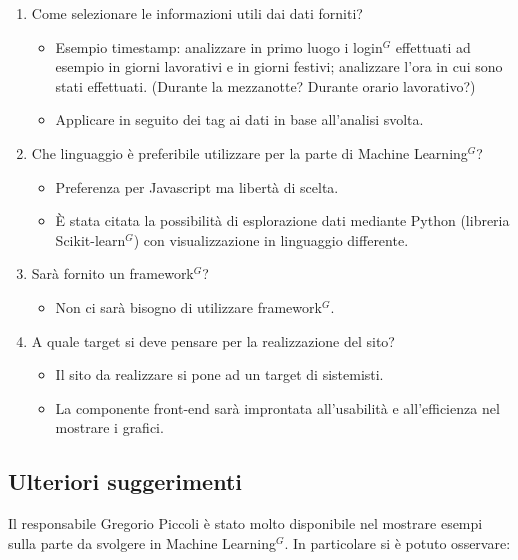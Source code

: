 \begin{enumerate}
	\item Come selezionare le informazioni utili dai dati forniti?
	\begin{itemize}
		\item Esempio timestamp: analizzare in primo luogo i login$^{G}$ effettuati ad esempio in giorni lavorativi e in giorni festivi; analizzare l'ora in cui sono stati effettuati. (Durante la mezzanotte? Durante orario lavorativo?)
		\item Applicare in seguito dei tag ai dati in base all'analisi svolta.
	\end{itemize}

	\item Che linguaggio è preferibile utilizzare per la parte di Machine Learning$^{G}$?
	\begin{itemize}
		\item Preferenza per Javascript ma libertà di scelta.
		\item \`E stata citata la possibilità di esplorazione dati mediante Python (libreria Scikit-learn$^{G}$) con visualizzazione in linguaggio differente.
	\end{itemize}

	\item Sarà fornito un framework$^{G}$?
	\begin{itemize}
		\item Non ci sarà bisogno di utilizzare framework$^{G}$.
	\end{itemize}

	\item A quale target si deve pensare per la realizzazione del sito?
	\begin{itemize}
		\item Il sito da realizzare si pone ad un target di sistemisti.
		\item La componente front-end sarà improntata all'usabilità e all'efficienza nel mostrare i grafici.
	\end{itemize}

\end{enumerate}

\subsection{Ulteriori suggerimenti}

Il responsabile Gregorio Piccoli è stato molto disponibile nel mostrare esempi sulla parte da svolgere in Machine Learning$^{G}$. In particolare si è potuto osservare:

